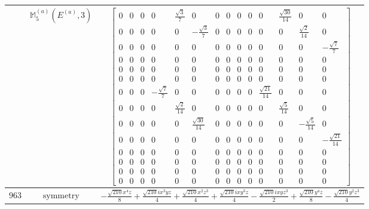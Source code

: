 \documentclass[fleqn,8pt,landscape]{jsarticle}
\begin{document}
\begin{longtable}{ccc}
$  $ & $ \mathbb{M}_{5}^{(a)}(E^{(a)},3) $ & $ \begin{bmatrix} 0 & 0 & 0 & 0 & \frac{\sqrt{3}}{7} & 0 & 0 & 0 & 0 & 0 & 0 & \frac{\sqrt{30}}{14} & 0 & 0 \\ 0 & 0 & 0 & 0 & 0 & - \frac{\sqrt{3}}{7} & 0 & 0 & 0 & 0 & 0 & 0 & \frac{\sqrt{2}}{14} & 0 \\ 0 & 0 & 0 & 0 & 0 & 0 & 0 & 0 & 0 & 0 & 0 & 0 & 0 & - \frac{\sqrt{7}}{7} \\ 0 & 0 & 0 & 0 & 0 & 0 & 0 & 0 & 0 & 0 & 0 & 0 & 0 & 0 \\ 0 & 0 & 0 & 0 & 0 & 0 & 0 & 0 & 0 & 0 & 0 & 0 & 0 & 0 \\ 0 & 0 & 0 & 0 & 0 & 0 & 0 & 0 & 0 & 0 & 0 & 0 & 0 & 0 \\ 0 & 0 & 0 & - \frac{\sqrt{7}}{7} & 0 & 0 & 0 & 0 & 0 & 0 & \frac{\sqrt{21}}{14} & 0 & 0 & 0 \\ 0 & 0 & 0 & 0 & \frac{\sqrt{2}}{14} & 0 & 0 & 0 & 0 & 0 & 0 & \frac{\sqrt{5}}{14} & 0 & 0 \\ 0 & 0 & 0 & 0 & 0 & \frac{\sqrt{30}}{14} & 0 & 0 & 0 & 0 & 0 & 0 & - \frac{\sqrt{5}}{14} & 0 \\ 0 & 0 & 0 & 0 & 0 & 0 & 0 & 0 & 0 & 0 & 0 & 0 & 0 & - \frac{\sqrt{21}}{14} \\ 0 & 0 & 0 & 0 & 0 & 0 & 0 & 0 & 0 & 0 & 0 & 0 & 0 & 0 \\ 0 & 0 & 0 & 0 & 0 & 0 & 0 & 0 & 0 & 0 & 0 & 0 & 0 & 0 \\ 0 & 0 & 0 & 0 & 0 & 0 & 0 & 0 & 0 & 0 & 0 & 0 & 0 & 0 \\ 0 & 0 & 0 & 0 & 0 & 0 & 0 & 0 & 0 & 0 & 0 & 0 & 0 & 0 \end{bmatrix} $ \\ \hline
$ 963 $ & $ \text{symmetry} $ & $ - \frac{\sqrt{210} x^{4} z}{8} + \frac{\sqrt{210} i x^{3} y z}{4} + \frac{\sqrt{210} x^{2} z^{3}}{4} + \frac{\sqrt{210} i x y^{3} z}{4} - \frac{\sqrt{210} i x y z^{3}}{2} + \frac{\sqrt{210} y^{4} z}{8} - \frac{\sqrt{210} y^{2} z^{3}}{4} $ \\

\end{longtable}
\end{document}
